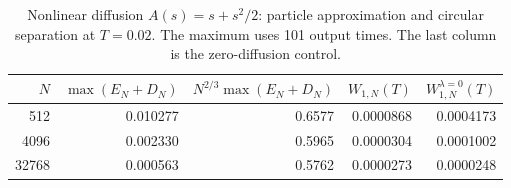 \begin{table}[htbp]
\centering\small
\caption{Nonlinear diffusion $A(s)=s+s^2/2$: particle approximation and circular separation at $T=0.02$. The maximum uses 101 output times. The last column is the zero-diffusion control.}\label{tab:nonlinear}
\begin{tabular}{@{}rrrrr@{}}\toprule
$N$ & $\max(E_N+D_N)$ & $N^{2/3}\max(E_N+D_N)$ & $W_{1,N}(T)$ & $W_{1,N}^{\lambda=0}(T)$ \\\midrule
512 & 0.010277 & 0.6577 & 0.0000868 & 0.0004173 \\
4096 & 0.002330 & 0.5965 & 0.0000304 & 0.0001002 \\
32768 & 0.000563 & 0.5762 & 0.0000273 & 0.0000248 \\
\bottomrule\end{tabular}
\end{table}
